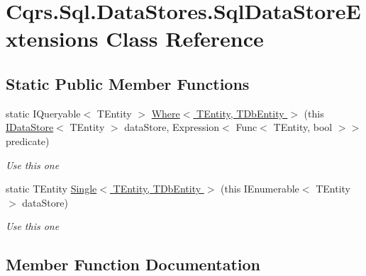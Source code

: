 \hypertarget{classCqrs_1_1Sql_1_1DataStores_1_1SqlDataStoreExtensions}{}\section{Cqrs.\+Sql.\+Data\+Stores.\+Sql\+Data\+Store\+Extensions Class Reference}
\label{classCqrs_1_1Sql_1_1DataStores_1_1SqlDataStoreExtensions}
\subsection*{Static Public Member Functions}
\begin{DoxyCompactItemize}
\item 
static I\+Queryable$<$ T\+Entity $>$ \hyperlink{classCqrs_1_1Sql_1_1DataStores_1_1SqlDataStoreExtensions_a77e339885a9e26ff6bcf5b5bbe24b19d_a77e339885a9e26ff6bcf5b5bbe24b19d}{Where$<$ T\+Entity, T\+Db\+Entity $>$} (this \hyperlink{interfaceCqrs_1_1DataStores_1_1IDataStore}{I\+Data\+Store}$<$ T\+Entity $>$ data\+Store, Expression$<$ Func$<$ T\+Entity, bool $>$$>$ predicate)
\begin{DoxyCompactList}\small\item\em Use this one \end{DoxyCompactList}\item 
static T\+Entity \hyperlink{classCqrs_1_1Sql_1_1DataStores_1_1SqlDataStoreExtensions_aff2943b536ef4fa182ce8b5194d65d86_aff2943b536ef4fa182ce8b5194d65d86}{Single$<$ T\+Entity, T\+Db\+Entity $>$} (this I\+Enumerable$<$ T\+Entity $>$ data\+Store)
\begin{DoxyCompactList}\small\item\em Use this one \end{DoxyCompactList}\end{DoxyCompactItemize}


\subsection{Member Function Documentation}
\mbox{\label{classCqrs_1_1Sql_1_1DataStores_1_1SqlDataStoreExtensions_aff2943b536ef4fa182ce8b5194d65d86_aff2943b536ef4fa182ce8b5194d65d86}} 
